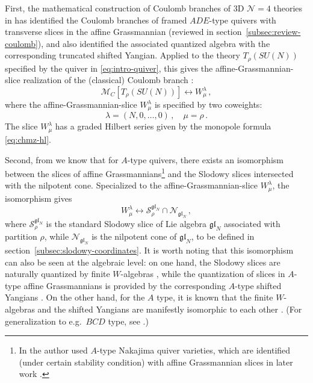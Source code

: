 \documentclass[12pt,a4paper]{article}
\begin{document}
\medskip

First, the mathematical construction of Coulomb branches of 3D $\mathcal N=4$ theories in \cite{BFN2019} has identified the Coulomb branches of framed $ADE$-type quivers with transverse slices in the affine Grassmannian (reviewed in section~\ref{subsec:review-coulomb}), and also identified the associated quantized algebra with the corresponding truncated shifted Yangian. Applied to the theory $T_\rho(SU(N))$ specified by the quiver in \eqref{eq:intro-quiver},
this gives the affine-Grassmannian-slice realization of the (classical) Coulomb branch \cite[Theorem~3.10]{BFN2019}:
\begin{equation}
    \mathcal M_C[T_\rho(SU(N))] \longleftrightarrow W^\lambda_\mu\,,
\end{equation}
where the affine-Grassmannian-slice $W^\lambda_\mu$ is specified by two coweights:
\begin{equation}
    \lambda=(N,0,\dots,0)\,,\quad\mu=\rho\,.
\end{equation}
The slice $W^\lambda_\mu$ has a graded Hilbert series given by the monopole formula \eqref{eq:chmz-hl}.

Second, from \cite{maffei2000} we know that for $A$-type quivers, there exists an isomorphism between the slices of affine Grassmannians\footnote{In \cite{maffei2000} the author used $A$-type Nakajima quiver varieties, which are identified (under certain stability condition) with affine Grassmannian slices in later work \cite{MV2002}. } and the Slodowy slices intersected with the nilpotent cone. Specialized to the affine-Grassmannian-slice $W^\lambda_\mu$, the isomorphism gives
\begin{equation}\label{eq:nakajima-slodowy}
    W^\lambda_\mu \longleftrightarrow \mathcal S^{\mathfrak{gl}_N}_\rho \cap \mathcal N_{\mathfrak{gl}_N}\,,
\end{equation}
where $\mathcal S^{\mathfrak{gl}_N}_\rho$ is the standard Slodowy slice of Lie algebra $\mathfrak{gl}_N$ associated with partition $\rho$, while $\mathcal{N}_{\mathfrak{gl}_N}$ is the nilpotent cone of $\mathfrak{gl}_N$, to be defined in section~\ref{subsec:slodowy-coordinates}.
It is worth noting that this isomorphism can also be seen at the algebraic level: on one hand,  the Slodowy slices are naturally quantized by finite $W$-algebras \cite{Premet2002, wang2010}, while the quantization of slices in $A$-type affine Grassmannians is provided by the corresponding $A$-type shifted Yangians \cite{KWWY2012}. On the other hand, for the $A$ type, it is known that the finite $W$-algebras and the shifted Yangians are manifestly isomorphic to each other \cite{BrundanKleshchev2004,BrundanKleshchev2006}. (For generalization to e.g.\ $BCD$ type, see \cite{luetal2025}.)
\end{document}
